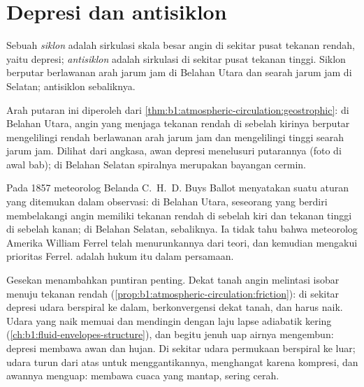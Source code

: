 \section{Depresi dan antisiklon}\label{sec:b1:atmospheric-circulation:cyclones}

\begin{definition}\label{def:b1:atmospheric-circulation:cyclone}
Sebuah \emph{siklon} adalah sirkulasi skala besar angin di sekitar pusat tekanan rendah, yaitu depresi; \emph{antisiklon} adalah sirkulasi di sekitar pusat tekanan tinggi. Siklon berputar berlawanan arah jarum jam di Belahan Utara dan searah jarum jam di Selatan; antisiklon sebaliknya.
\end{definition}

Arah putaran ini diperoleh dari \cref{thm:b1:atmospheric-circulation:geostrophic}: di Belahan Utara, angin yang menjaga tekanan rendah di sebelah kirinya berputar mengelilingi rendah berlawanan arah jarum jam dan mengelilingi tinggi searah jarum jam. Dilihat dari angkasa, awan depresi menelusuri putarannya (foto di awal bab); di Belahan Selatan spiralnya merupakan bayangan cermin.

\begin{history}
Pada 1857 meteorolog Belanda C.~H.~D. Buys Ballot menyatakan suatu aturan yang ditemukan dalam observasi: di Belahan Utara, seseorang yang berdiri membelakangi angin memiliki tekanan rendah di sebelah kiri dan tekanan tinggi di sebelah kanan; di Belahan Selatan, sebaliknya. Ia tidak tahu bahwa meteorolog Amerika William Ferrel telah menurunkannya dari teori, dan kemudian mengakui prioritas Ferrel.  adalah hukum itu dalam persamaan.
\end{history}

Gesekan menambahkan puntiran penting. Dekat tanah angin melintasi isobar menuju tekanan rendah (\cref{prop:b1:atmospheric-circulation:friction}): di sekitar depresi udara berspiral ke dalam, berkonvergensi dekat tanah, dan harus naik. Udara yang naik memuai dan mendingin dengan laju lapse adiabatik kering (\cref{ch:b1:fluid-envelopes-structure}), dan begitu jenuh uap airnya mengembun: depresi membawa awan dan hujan. Di sekitar  udara permukaan berspiral ke luar; udara turun dari atas untuk menggantikannya, menghangat karena kompresi, dan awannya menguap:  membawa cuaca yang mantap, sering cerah.

